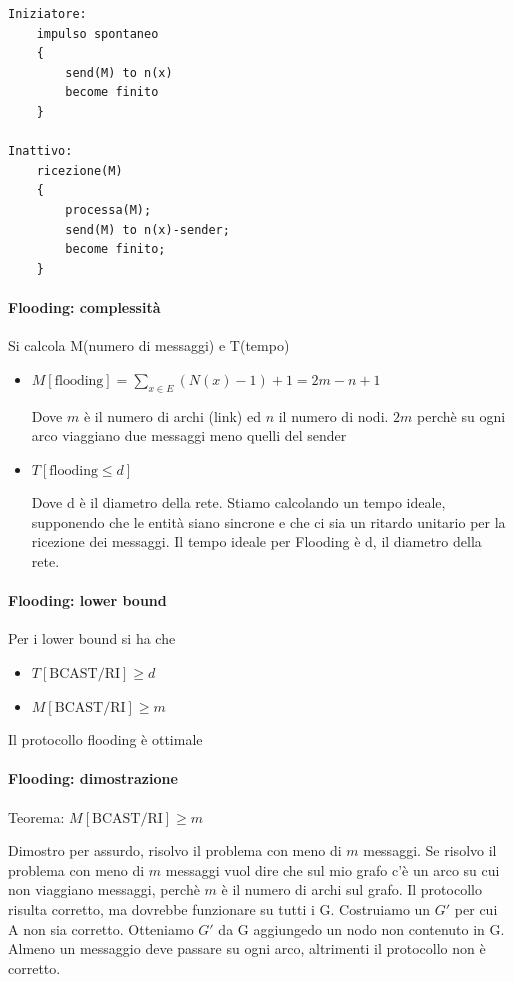 \begin{lstlisting}
Iniziatore:
    impulso spontaneo
    {
        send(M) to n(x)
        become finito
    }

Inattivo:
    ricezione(M)
    {
        processa(M);
        send(M) to n(x)-sender;
        become finito;
    }
\end{lstlisting}

\paragraph{Flooding: complessità}
Si calcola M(numero di messaggi) e T(tempo)
\begin{itemize}
    \item $M[\text{flooding}] = \sum_{x \in E} (N(x)-1) + 1 = 2m - n + 1$
    
    Dove $m$ è il numero di archi (link) ed $n$ il numero di nodi. $2m$ perchè su ogni arco viaggiano due messaggi meno quelli del sender 
    \item $T[\text{flooding} \leq d]$

    
    Dove d è il diametro della rete. Stiamo calcolando un tempo ideale, supponendo che le entità siano sincrone e che ci sia un ritardo unitario per la ricezione dei messaggi. Il tempo ideale per Flooding è d, il diametro della rete.
\end{itemize}

\paragraph{Flooding: lower bound}
Per i lower bound si ha che
\begin{itemize}
    \item $T[\text{BCAST/RI}] \geq d$
    \item $M[\text{BCAST/RI}] \geq m$
\end{itemize}
Il protocollo flooding è ottimale

\paragraph{Flooding: dimostrazione}
Teorema: $M[\text{BCAST/RI}] \geq m$

Dimostro per assurdo, risolvo il problema con meno di $m$ messaggi. Se risolvo il problema con meno di $m$ messaggi vuol dire che sul mio grafo c'è un arco su cui non viaggiano messaggi, perchè $m$ è il numero di archi sul grafo. Il protocollo risulta corretto, ma dovrebbe funzionare su tutti i G. Costruiamo un $G\prime$ per cui A non sia corretto. Otteniamo $G\prime$ da G aggiungedo un nodo non contenuto in G. Almeno un messaggio deve passare su ogni arco, altrimenti il protocollo non è corretto.

